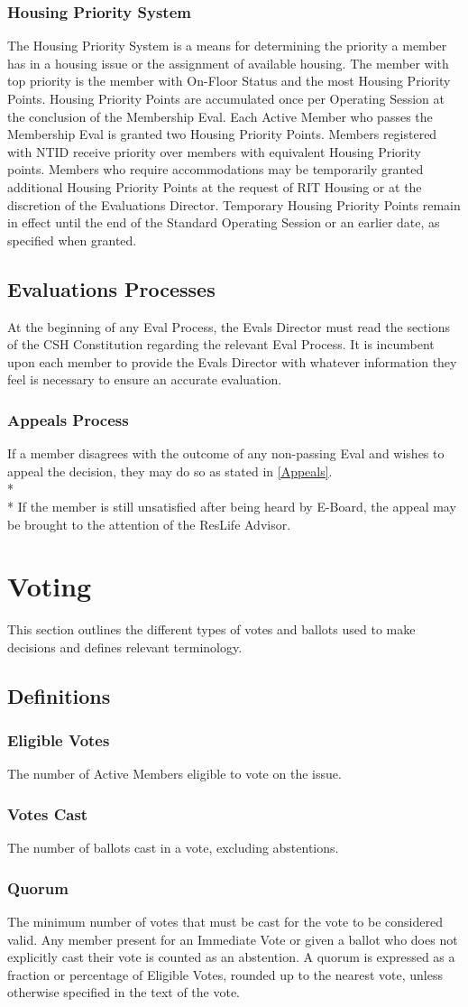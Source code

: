 \documentclass{article}
\newcommand{\article}[1]{\section{#1} \label{#1}}
\newcommand{\asection}[1]{\subsection{#1} \label{#1}}
\newcommand{\asubsection}[1]{\subsubsection{#1} \label{#1}}
\begin{document}
\asubsection{Housing Priority System}
The Housing Priority System is a means for determining the priority a member has in a housing issue or the assignment of available housing.
The member with top priority is the member with On-Floor Status and the most Housing Priority Points.
Housing Priority Points are accumulated once per Operating Session at the conclusion of the Membership Eval.
Each Active Member who passes the Membership Eval is granted two Housing Priority Points.
Members registered with NTID receive priority over members with equivalent Housing Priority points. %
Members who require accommodations may be temporarily granted additional Housing Priority Points at the request of RIT Housing or at the discretion of the Evaluations Director. 
Temporary Housing Priority Points remain in effect until the end of the Standard Operating Session or an earlier date, as specified when granted.

\asection{Evaluations Processes}
At the beginning of any Eval Process, the Evals Director must read the sections of the CSH Constitution regarding the relevant Eval Process.
It is incumbent upon each member to provide the Evals Director with whatever information they feel is necessary to ensure an accurate evaluation.

\asubsection{Appeals Process}
If a member disagrees with the outcome of any non-passing Eval and wishes to appeal the decision, they may do so as stated in \ref{Appeals}.
\\* \\*
If the member is still unsatisfied after being heard by E-Board, the appeal may be brought to the attention of the ResLife Advisor.

\article{Voting}
This section outlines the different types of votes and ballots used to make decisions and defines relevant terminology.

\asection{Definitions}

\asubsection{Eligible Votes}
The number of Active Members eligible to vote on the issue.

\asubsection{Votes Cast}
The number of ballots cast in a vote, excluding abstentions.

\asubsection{Quorum}
The minimum number of votes that must be cast for the vote to be considered valid.
Any member present for an Immediate Vote or given a ballot who does not explicitly cast their vote is counted as an abstention.
A quorum is expressed as a fraction or percentage of Eligible Votes, rounded up to the nearest vote, unless otherwise specified in the text of the vote.
\end{document}
